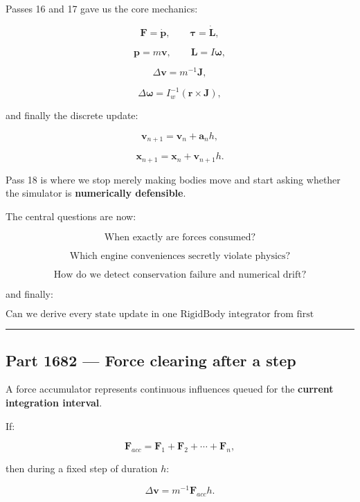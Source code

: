 Passes 16 and 17 gave us the core mechanics:

\[
\mathbf F=\dot{\mathbf p},
\qquad
\boldsymbol\tau=\dot{\mathbf L},
\]

\[
\mathbf p=m\mathbf v,
\qquad
\mathbf L=I\boldsymbol\omega,
\]

\[
\Delta \mathbf v=m^{-1}\mathbf J,
\]

\[
\Delta\boldsymbol\omega
=
I_w^{-1}
(\mathbf r\times\mathbf J),
\]

and finally the discrete update:

\[
\mathbf v_{n+1}
=
\mathbf v_n+\mathbf a_nh,
\]

\[
\mathbf x_{n+1}
=
\mathbf x_n+\mathbf v_{n+1}h.
\]

Pass 18 is where we stop merely making bodies move and start asking whether the simulator is \textbf{numerically defensible}.

The central questions are now:

\[
\boxed{
\text{When exactly are forces consumed?}
}
\]

\[
\boxed{
\text{Which engine conveniences secretly violate physics?}
}
\]

\[
\boxed{
\text{How do we detect conservation failure and numerical drift?}
}
\]

and finally:

\[
\boxed{
\text{Can we derive every state update in one RigidBody integrator from first principles?}
}
\]

\begin{center}\rule{0.5\linewidth}{0.5pt}\end{center}

\subsection{Part 1682 --- Force clearing after a step}\label{06-engine-ii-ch038-part-1682-force-clearing-after-a-step}

\hypertarget{06-engine-ii-ch038-part-1682-force-clearing-after-a-step}{}

A force accumulator represents continuous influences queued for the \textbf{current integration interval}.

If:

\[
\mathbf F_{acc}
=
\mathbf F_1+\mathbf F_2+\cdots+\mathbf F_n,
\]

then during a fixed step of duration \(h\):

\[
\Delta\mathbf v
=
m^{-1}\mathbf F_{acc}h.
\]

